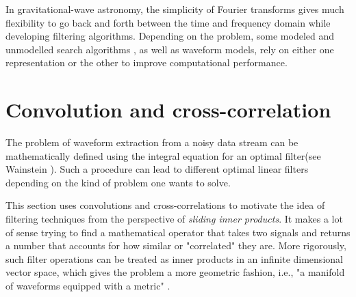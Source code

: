 \FloatBarrier

%
%
%

In gravitational-wave astronomy, the simplicity of Fourier transforms gives much flexibility to go back and forth between the time and frequency domain while developing filtering algorithms. Depending on the problem, some modeled and unmodelled search algorithms \cite{Drago:2020kic,Cornish_2015}, as well as waveform models, rely on either one representation or the other to improve computational performance.


\section{Convolution and cross-correlation}

The problem of waveform extraction from a noisy data stream can be mathematically defined using the integral equation for an optimal filter(see Wainstein \cite{Wainstein:1962vrq}). Such a procedure can lead to different optimal linear filters depending on the kind of problem one wants to solve. 

This section uses convolutions and cross-correlations to motivate the idea of filtering techniques from the perspective of \textit{sliding inner products}. It makes a lot of sense trying to find a mathematical operator that takes two signals and returns a number that accounts for how similar or "correlated" they are. More rigorously, such filter operations can be treated as inner products in an infinite dimensional vector space, which gives the problem a more geometric fashion, i.e., "a manifold of waveforms equipped with a metric" \cite{Andersson:2019yve,Creighton:2011zz}.

